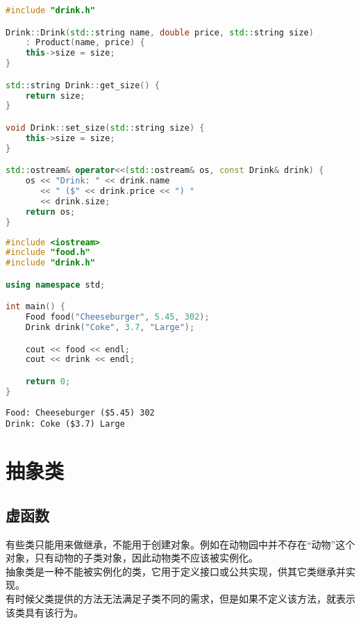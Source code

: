 \begin{lstlisting}[language=C++]
#include "drink.h"

Drink::Drink(std::string name, double price, std::string size)
    : Product(name, price) {
    this->size = size;
}

std::string Drink::get_size() {
    return size;
}

void Drink::set_size(std::string size) {
    this->size = size;
}

std::ostream& operator<<(std::ostream& os, const Drink& drink) {
    os << "Drink: " << drink.name
       << " ($" << drink.price << ") " 
       << drink.size;
    return os;
}
\end{lstlisting}

\begin{lstlisting}[language=C++]
#include <iostream>
#include "food.h"
#include "drink.h"

using namespace std;

int main() {
    Food food("Cheeseburger", 5.45, 302);
    Drink drink("Coke", 3.7, "Large");

    cout << food << endl;
    cout << drink << endl;

    return 0;
}
\end{lstlisting}

\begin{tcolorbox}
    \begin{verbatim}
Food: Cheeseburger ($5.45) 302
Drink: Coke ($3.7) Large
	\end{verbatim}
\end{tcolorbox}

\newpage

\section{抽象类}

\subsection{虚函数}

有些类只能用来做继承，不能用于创建对象。例如在动物园中并不存在“动物”这个对象，只有动物的子类对象，因此动物类不应该被实例化。\\

抽象类是一种不能被实例化的类，它用于定义接口或公共实现，供其它类继承并实现。\\

有时候父类提供的方法无法满足子类不同的需求，但是如果不定义该方法，就表示该类具有该行为。\\

